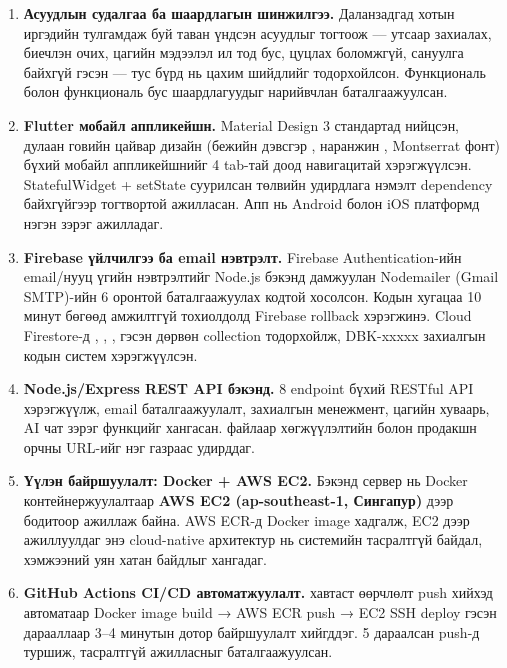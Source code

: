 \begin{enumerate}
    \item \textbf{Асуудлын судалгаа ба шаардлагын шинжилгээ.} Даланзадгад хотын иргэдийн тулгамдаж буй таван үндсэн асуудлыг тогтоож — утсаар захиалах, биечлэн очих, цагийн мэдээлэл ил тод бус, цуцлах боломжгүй, сануулга байхгүй гэсэн --- тус бүрд нь цахим шийдлийг тодорхойлсон. Функциональ болон функциональ бус шаардлагуудыг нарийвчлан баталгаажуулсан.

    \item \textbf{Flutter мобайл аппликейшн.} Material Design 3 стандартад нийцсэн, дулаан говийн цайвар дизайн (бежийн дэвсгэр , наранжин , Montserrat фонт) бүхий мобайл аппликейшнийг 4 tab-тай доод навигацитай хэрэгжүүлсэн. StatefulWidget + setState суурилсан төлвийн удирдлага нэмэлт dependency байхгүйгээр тогтвортой ажилласан. Апп нь Android болон iOS платформд нэгэн зэрэг ажилладаг.

    \item \textbf{Firebase үйлчилгээ ба email нэвтрэлт.} Firebase Authentication-ийн email/нууц үгийн нэвтрэлтийг Node.js бэкэнд дамжуулан Nodemailer (Gmail SMTP)-ийн 6 оронтой баталгаажуулах кодтой хосолсон. Кодын хугацаа 10 минут бөгөөд амжилтгүй тохиолдолд Firebase rollback хэрэгжинэ. Cloud Firestore-д , , ,  гэсэн дөрвөн collection тодорхойлж, DBK-xxxxx захиалгын кодын систем хэрэгжүүлсэн.

    \item \textbf{Node.js/Express REST API бэкэнд.} 8 endpoint бүхий RESTful API хэрэгжүүлж, email баталгаажуулалт, захиалгын менежмент, цагийн хуваарь, AI чат зэрэг функцийг хангасан.  файлаар хөгжүүлэлтийн болон продакшн орчны URL-ийг нэг газраас удирддаг.

    \item \textbf{Үүлэн байршуулалт: Docker + AWS EC2.} Бэкэнд сервер нь Docker контейнержуулалтаар \textbf{AWS EC2 (ap-southeast-1, Сингапур)} дээр бодитоор ажиллаж байна. AWS ECR-д Docker image хадгалж, EC2 дээр ажиллуулдаг энэ cloud-native архитектур нь системийн тасралтгүй байдал, хэмжээний уян хатан байдлыг хангадаг.

    \item \textbf{GitHub Actions CI/CD автоматжуулалт.}  хавтаст өөрчлөлт push хийхэд автоматаар Docker image build → AWS ECR push → EC2 SSH deploy гэсэн дарааллаар 3--4 минутын дотор байршуулалт хийгддэг. 5 дараалсан push-д туршиж, тасралтгүй ажилласныг баталгаажуулсан.


\end{enumerate}
